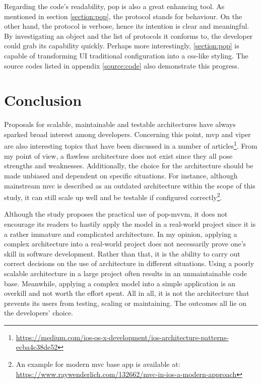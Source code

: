 \documentclass[11pt,a4paper,oneside,article]{memoir}
\begin{document}
Regarding the code's readability, \gls{pop} is also a great enhancing tool. As mentioned in section \ref{section:pop}, the protocol stands for behaviour. On the other hand, the protocol is verbose, hence its intention is clear and meaningful. By investigating an object and the list of protocols it conforms to, the developer could grab its capability quickly. Perhaps more interestingly, \ref{section:pop} is capable of transforming UI traditional configuration into a \gls{css}-like styling. The source codes listed in appendix \ref{source:code} also demonstrate this progress.

\newpage
\chapter{Conclusion}
Proposals for scalable, maintainable and testable architectures have always sparked broad interest among developers. Concerning this point, \gls{mvp} and \gls{viper} are also interesting topics that have been discussed in a number of articles\footnote{\url{https://medium.com/ios-os-x-development/ios-architecture-patterns-ecba4c38de52}}. From my point of view, a flawless architecture does not exist since they all pose strengths and weaknesses. Additionally, the choice for the architecture should be made unbiased and dependent on specific situations. For instance, although mainstream \gls{mvc} is described as an outdated architecture within the scope of this study, it can still scale up well and be testable if configured correctly\footnote{An example for modern \gls{mvc} base app is available at: \url{https://www.raywenderlich.com/132662/mvc-in-ios-a-modern-approach}}. 

Although the study proposes the practical use of \gls{pop-mvvm}, it does not encourage its readers to hastily apply the model in a real-world project since it is a rather immature and complicated architecture. In my opinion, applying a complex architecture into a real-world project does not necessarily prove one's skill in software development. Rather than that, it is the ability to carry out correct decisions on the use of architecture in different situations. Using a poorly scalable architecture in a large project often results in an unmaintainable code base. Meanwhile, applying a complex model into a simple application is an overkill and not worth the effort spent. All in all, it is not the architecture that prevents its users from testing, scaling or maintaining. The outcomes all lie on the developers' choice. 
\end{document}
